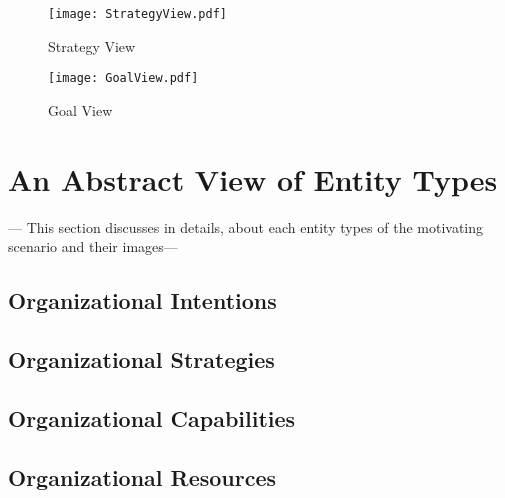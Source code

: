 \begin{figure}
	\centering
	\texttt{[image: StrategyView.pdf]}
	\caption{Strategy View}
	\label{fig:strategyview}
\end{figure}

\begin{figure}
	\centering
	\texttt{[image: GoalView.pdf]}
	\caption{Goal View}
	\label{fig:goalview}
\end{figure}

\section{An Abstract View of Entity Types}
\label{sec:entities}
 --- This section discusses in details, about each entity types of the motivating scenario and 
 their images---
 

\subsection{Organizational Intentions} 
\label{sec:intentions}


\subsection{Organizational Strategies} 
\label{sec:strategies}

\subsection{Organizational Capabilities}
\label{sec:capabilities}



\subsection{Organizational Resources} 
\label{sec:resources}

